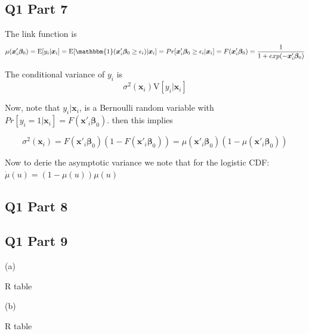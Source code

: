\documentclass[11pt]{article}
\newcommand{\E}{\mathrm{E}}
\newcommand{\V}{\mathrm{V}}
\begin{document}
\subsection{Q1 Part 7}
The link function is 
$$\mu(\bm{x}'_i \bm{\beta}_0) = \E[y_i|\bm{x}_i] = \E[\mathbbm{1}(\bm{x}'_i \bm{\beta}_0 \geq \epsilon_i)|\bm{x}_i] =Pr[\bm{x}'_i \bm{\beta}_0 \geq \epsilon_i|\bm{x}_i] = F(\bm{x}'_i \bm{\beta}_0) = \frac{1}{1+exp(-\bm{x}'_i \bm{\beta}_0)}
$$

The conditional variance of $y_i$ is 
$$\sigma^2(\bm{x}_i) \V[y_i|\bm{x}_i]$$

Now, note that $y_i|\bm{x}_i$, is a Bernoulli random variable with $Pr[y_i = 1|\bm{x}_i] = F(\bm{x}'_i \bm{\beta}_0). $ then this implies 

$$ \sigma^2(\bm{x}_i) = F(\bm{x}'_i\bm{\beta}_0)(1-F(\bm{x}'_i\bm{\beta}_0))= \mu(\bm{x}'_i\bm{\beta}_0)(1-\mu(\bm{x}'_i\bm{\beta}_0))
$$

Now to derie the asymptotic variance we note that for the logistic CDF: $\dot{\mu}(u)=(1-\mu(u))\mu(u)$
\subsection{Q1 Part 8}



\subsection{Q1 Part 9 }
(a)\\

\centerline{R table }

\begin{center}
	
\end{center}



(b)

\centerline{R table }

\begin{center}
	
\end{center}
\end{document}
